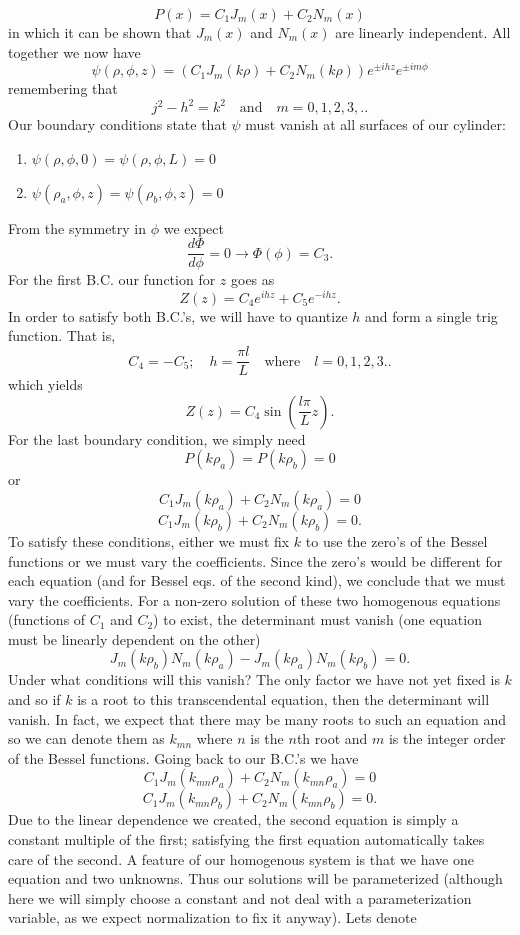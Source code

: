 \documentclass[11pt,letterpaper]{article}
\begin{document}
\begin{enumerate}
\begin{enumerate}
$$P(x) = C_1J_m(x)+C_2N_m(x)$$ 
in which it can be shown that $J_m(x)$ and $N_m(x)$ are linearly independent. All together we now have
$$\psi(\rho,\phi,z) = (C_1J_m(k\rho)+C_2N_m(k\rho))e^{\pm ihz}e^{\pm im\phi}$$
remembering that
$$j^2-h^2 = k^2\quad\text{and}\quad m=0,1,2,3,..$$
Our boundary conditions state that $\psi$ must vanish at all surfaces of our cylinder:
\begin{enumerate}
\item $\psi(\rho,\phi,0) = \psi(\rho,\phi,L) = 0$
\item $\psi(\rho_a,\phi,z)=\psi(\rho_b,\phi,z) = 0$
\end{enumerate}
From the symmetry in $\phi$ we expect 
$$\frac{d\Phi}{d\phi}= 0\rightarrow \Phi(\phi) = C_3.$$ For the first B.C. our function for $z$ goes as
$$Z(z) = C_4e^{ihz}+C_5e^{-ihz}.$$
In order to satisfy both B.C.'s, we will have to quantize $h$ and form a single trig function. That is,
$$C_4 = -C_5;\quad h = \frac{\pi l}{L}\quad\text{where}\quad l=0,1,2,3..$$
which yields 
$$Z(z) = C_4\sin\left(\frac{l\pi}{L}z\right).$$
For the last boundary condition, we simply need
$$P(k\rho_a) = P(k\rho_b) = 0$$
or
$$C_1J_m(k\rho_a)+C_2N_m(k\rho_a) = 0$$
$$C_1J_m(k\rho_b)+C_2N_m(k\rho_b) = 0.$$
To satisfy these conditions, either we must fix $k$ to use the zero's of the Bessel functions or we must vary the coefficients. Since the zero's would be different for each equation (and for Bessel eqs. of the second kind), we conclude that we must vary the coefficients. For a non-zero solution of these two homogenous equations (functions of $C_1$ and $C_2$) to exist, the determinant must vanish (one equation must be linearly dependent on the other)
$$J_m(k\rho_b)N_m(k\rho_a)-J_m(k\rho_a)N_m(k\rho_b) = 0.$$
Under what conditions will this vanish? The only factor we have not yet fixed is $k$ and so if $k$ is a root to this transcendental equation, then the determinant will vanish. In fact, we expect that there may be many roots to such an equation and so we can denote them as $k_{mn}$ where $n$ is the $n$th root and $m$ is the integer order of the Bessel functions. Going back to our B.C.'s we have
$$C_1J_m(k_{mn}\rho_a)+C_2N_m(k_{mn}\rho_a) = 0$$
$$C_1J_m(k_{mn}\rho_b)+C_2N_m(k_{mn}\rho_b) = 0.$$
Due to the linear dependence we created, the second equation is simply a constant multiple of the first; satisfying the first equation automatically takes care of the second. A feature of our homogenous system is that we have one equation and two unknowns. Thus our solutions will be parameterized (although here we will simply choose a constant and not deal with a parameterization variable, as we expect normalization to fix it anyway). Lets denote

\end{enumerate}
\end{enumerate}
\end{document}
